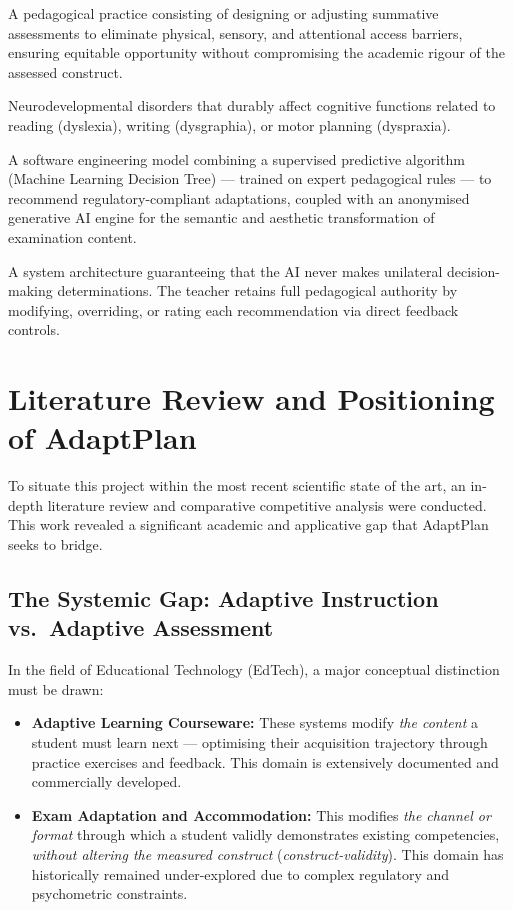 \documentclass[12pt,a4paper]{report}
\begin{document}
\begin{description}[leftmargin=2em, style=nextline]
  \item[Inclusive Assessment] A pedagogical practice consisting of designing or adjusting summative assessments to eliminate physical, sensory, and attentional access barriers, ensuring equitable opportunity without compromising the academic rigour of the assessed construct.
  \item[Specific Learning Difficulties (SLD)] Neurodevelopmental disorders that durably affect cognitive functions related to reading (dyslexia), writing (dysgraphia), or motor planning (dyspraxia).
  \item[Dual Intelligent Engine] A software engineering model combining a supervised predictive algorithm (Machine Learning Decision Tree) — trained on expert pedagogical rules — to recommend regulatory-compliant adaptations, coupled with an anonymised generative AI engine for the semantic and aesthetic transformation of examination content.
  \item[Teacher-in-the-Loop] A system architecture guaranteeing that the AI never makes unilateral decision-making determinations. The teacher retains full pedagogical authority by modifying, overriding, or rating each recommendation via direct feedback controls.
\end{description}

\section{Literature Review and Positioning of AdaptPlan}

To situate this project within the most recent scientific state of the art, an in-depth literature review and comparative competitive analysis were conducted. This work revealed a significant academic and applicative gap that AdaptPlan seeks to bridge.

\subsection{The Systemic Gap: Adaptive Instruction vs.\ Adaptive Assessment}

In the field of Educational Technology (EdTech), a major conceptual distinction must be drawn:

\begin{itemize}[leftmargin=*]
  \item \textbf{Adaptive Learning Courseware:} These systems modify \textit{the content} a student must learn next — optimising their acquisition trajectory through practice exercises and feedback. This domain is extensively documented and commercially developed.
  \item \textbf{Exam Adaptation and Accommodation:} This modifies \textit{the channel or format} through which a student validly demonstrates existing competencies, \textit{without altering the measured construct} (\textit{construct-validity}). This domain has historically remained under-explored due to complex regulatory and psychometric constraints.
\end{itemize}
\end{document}
